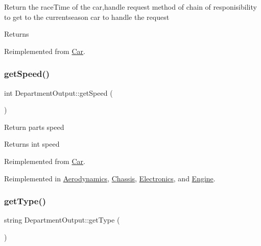 Return the race\+Time of the car,handle request method of chain of responisibility to get to the currentseason car to handle the request \begin{DoxyReturn}{Returns}

\end{DoxyReturn}


Reimplemented from \hyperlink{classCar_ac30e13eba209c1ca3bba99bf6741094a}{Car}.

\mbox{\label{classDepartmentOutput_a90caf8934a687d18b9855f19a421ecef}} 
\subsubsection{\texorpdfstring{get\+Speed()}{getSpeed()}}
{\footnotesize\ttfamily int Department\+Output\+::get\+Speed (\begin{DoxyParamCaption}{ }\end{DoxyParamCaption})\hspace{0.3cm}{\ttfamily [virtual]}}

Return parts speed \begin{DoxyReturn}{Returns}
int speed 
\end{DoxyReturn}


Reimplemented from \hyperlink{classCar_a18e48b5cf9815216b8e82351d36b8d9f}{Car}.



Reimplemented in \hyperlink{classAerodynamics_aeee4abded0da2a826af0f3a4c0cdf991}{Aerodynamics}, \hyperlink{classChassis_a095c63aa079ebd8d7fc04f238fd1e56c}{Chassis}, \hyperlink{classElectronics_a09912c940a0a8656d97f8597b766c0eb}{Electronics}, and \hyperlink{classEngine_a5f828ac1355f02d43f8bae90fbddb131}{Engine}.

\mbox{\label{classDepartmentOutput_a9366794b5b64ed37cf37ed6443eecf01}} 
\subsubsection{\texorpdfstring{get\+Type()}{getType()}}
{\footnotesize\ttfamily string Department\+Output\+::get\+Type (\begin{DoxyParamCaption}{ }\end{DoxyParamCaption})\hspace{0.3cm}{\ttfamily [virtual]}}

